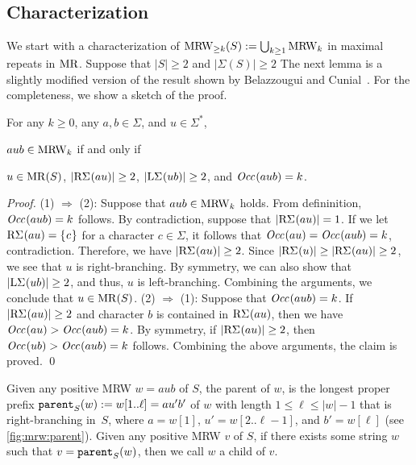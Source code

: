 \subsection{Characterization}
We start with a characterization of $\MRWS[\ge k](S) := \bigcup_{k\ge 1}\MRWK[k]$ in maximal repeats in $\MR$. 
Suppose that $|S|\ge 2$ and $|\Sigma(S)|\ge 2$
The next lemma is a slightly modified version of the result shown by Belazzougui and Cunial~\cite{belazzougui2015space:unusual}. For the completeness, we show a sketch of the proof. 

\begin{lemma}\label{lem:posmrw:characterization}
For any $k\ge 0$, any $a, b \in \Sigma$, and $u\in\Sigma^*$, 
\begin{enumerate*}[(1)]
\item $aub \in \MRWK[k]$ if and only if 
\item $u\in\MR(S)$, $|\RSigma[](au)| \ge 2$, $|\LSigma[](ub)| \ge 2$, and $\Occ[](aub) = k$. 
\end{enumerate*}
\end{lemma}

\begin{proof}
  (1) $\Rightarrow$ (2):  Suppose that $aub \in \MRWK[k]$ holds. From defininition, $\Occ[](aub) = k$ follows. By contradiction, suppose that $|\RSigma[](au)| = 1$. If we let $\RSigma[](au) = \set{c}$ for a character $c \in \Sigma$, it follows that $\Occ[](au) = \Occ[](aub) = k$, contradiction. Therefore, we have $|\RSigma[](au)| \ge 2$. Since $|\RSigma[](u)| \ge |\RSigma[](au)| \ge 2$, we see that $u$ is right-branching. By symmetry, we can also show that $|\LSigma[](ub)| \ge 2$, and thus, $u$ is left-branching. Combining the arguments, we conclude that $u \in \MR(S)$.
 (2) $\Rightarrow$ (1):  Suppose that $\Occ[](aub) = k$. 
  If $|\RSigma[](au)| \ge 2$ and character $b$ is contained in $\RSigma[](au)$, then we have $\Occ[](au) > \Occ[](aub) = k$. By symmetry, if $|\RSigma[](au)| \ge 2$, then $\Occ[](ub) > \Occ[](aub) = k$ follows. Combining the above arguments, the claim is proved. 
\qed\end{proof}

\begin{definition}
  \label{def:mrw:parent}
  Given any positive MRW $w = aub$ of $S$, the parent of $w$, is the longest proper prefix
  $\op{parent}_{S}(w)
  := w[1..\ell]
  = a u' b'$
  of $w$ with length $1\le \ell \le |w|-1$ that is right-branching in~$S$, where
  $a = w[1]$, 
  $u' = w[2..\ell-1]$, and 
  $b' = w[\ell]$ (see \cref{fig:mrw:parent}).
Given any positive MRW $v$ of $S$, if there exists some string $w$ such that $v = \op{parent}_{S}(w)$, then we call $w$ a child of $v$. 
\end{definition}


